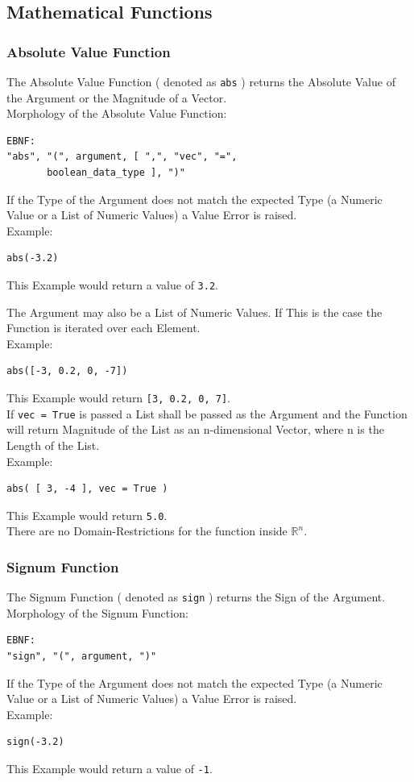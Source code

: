 \documentclass{report}
\begin{document}
\subsection{Mathematical Functions}
\subsubsection{Absolute Value Function}
The Absolute Value Function ( denoted as \texttt{abs} ) returns the Absolute Value of the Argument or the Magnitude of a Vector. \\
Morphology of the Absolute Value Function:
\begin{verbatim}
EBNF:
"abs", "(", argument, [ ",", "vec", "=", 
       boolean_data_type ], ")"
\end{verbatim}
If the Type of the Argument does not match the expected Type (a Numeric Value or a List of Numeric Values) a Value Error is raised.\\
Example:
\begin{verbatim}
abs(-3.2)
\end{verbatim}
This Example would return a value of \texttt{3.2}.

The Argument may also be a List of Numeric Values. If This is the case the Function is iterated over each Element.\\
Example:
\begin{verbatim}
abs([-3, 0.2, 0, -7])
\end{verbatim}
This Example would return \texttt{[3, 0.2, 0, 7]}. \vspace{5 mm}\\
If \texttt{vec = True} is passed a List shall be passed as the Argument and the Function will return Magnitude of the List as an n-dimensional Vector, where n is the Length of the List.\\ %
Example:
\begin{verbatim}
abs( [ 3, -4 ], vec = True )
\end{verbatim}
This Example would return \texttt{5.0}.\\
There are no Domain-Restrictions for the function inside $\mathbb{R}^n$.

\subsubsection{Signum Function}
The Signum Function ( denoted as \texttt{sign} ) returns the Sign of the Argument. \\
Morphology of the Signum Function:
\begin{verbatim}
EBNF:
"sign", "(", argument, ")"
\end{verbatim}
If the Type of the Argument does not match the expected Type (a Numeric Value or a List of Numeric Values) a Value Error is raised.\\
Example:
\begin{verbatim}
sign(-3.2)
\end{verbatim}
This Example would return a value of \texttt{-1}.
\end{document}
